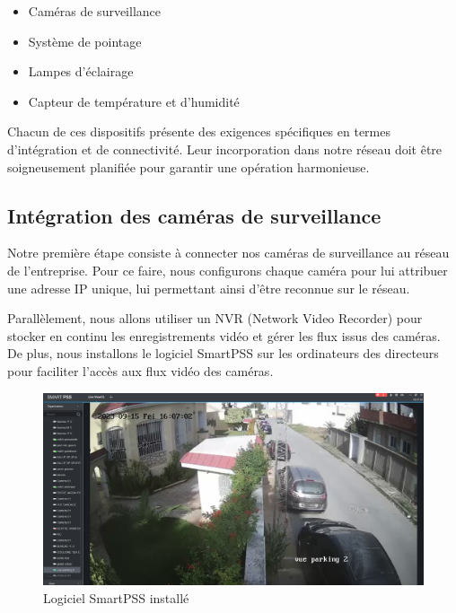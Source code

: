 \begin{itemize}
\item Caméras de surveillance

\item Système de pointage

\item Lampes d'éclairage

\item Capteur de température et d'humidité
\end{itemize}

Chacun de ces dispositifs présente des exigences spécifiques en termes d'intégration et de connectivité. Leur incorporation dans notre réseau doit être soigneusement planifiée pour garantir une opération harmonieuse.

\subsection{Intégration des caméras de surveillance}

Notre première étape consiste à connecter nos caméras de surveillance au réseau de l'entreprise. Pour ce faire, nous configurons chaque caméra pour lui attribuer une adresse IP unique, lui permettant ainsi d'être reconnue sur le réseau. 

Parallèlement, nous allons utiliser un NVR (Network Video Recorder) pour stocker en continu les enregistrements vidéo et gérer les flux issus des caméras. De plus, nous installons le logiciel SmartPSS sur les ordinateurs des directeurs pour faciliter l'accès aux flux vidéo des caméras.

\begin{figure}[H]
\centering
\includegraphics[width=15cm]{Images/SmartPSS1.png}
\caption{Logiciel SmartPSS installé}
\label{Chap4.2.4}
\end{figure}
\smallskip

